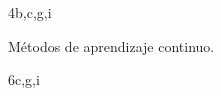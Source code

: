 \begin{syllabus}
	\begin{unit}{\LUONEEIGHTDef}{}{\LUONEEIGHTBib}{4}{b,c,g,i}
	   \begin{topics}
				\item Métodos de aprendizaje continuo.
	   \end{topics}
		\LUONEEIGHTGoal
	\end{unit}
	
	\begin{unit}{\LUONETWODef}{}{\LUONETWOBib}{6}{c,g,i}
	   \begin{topics}
		\item \ITONETopicONExONExONE
		\begin{subtopics}
			\item \ITONETopicONExONExONExTWO
		\end{subtopics}
		\item \OMCONEOHTopicTWOxONEOHxTHREE
		\item \OMCONEOHTopicTWOxONEOHxEIGHT
		\item \OMCTWOTopicTWOxTWOxTHREE
		\item \OMCFOURTopicTWOxFOURxTHREE
		\item \OMCFOURTopicTWOxFOURxFOUR
		\item \OMCFOURTopicTWOxFOURxFIVE
		\item \OMCEIGHTTopicTWOxEIGHTxTHREE
		\item \OMCEIGHTTopicTWOxEIGHTxFOUR
		\item \TDSSEVENTopicTHREExSEVENxFOUR
		\item \TDSSEVENTopicTHREExSEVENxNINE
	   \end{topics}
		\LUONETWOGoal
	\end{unit}
	
	\begin{coursebibliography}
	\end{coursebibliography}
	
	\end{syllabus}
	